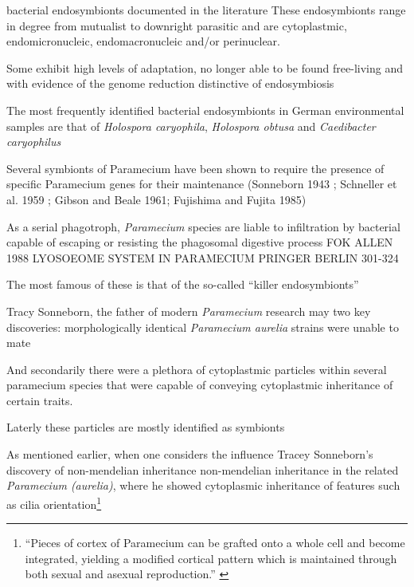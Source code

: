 bacterial endosymbionts documented in the literature \citep{Gortz2009}
These endosymbionts range in degree from mutualist to downright parasitic and are cytoplastmic, endomicronucleic,
endomacronucleic and/or perinuclear. 

Some exhibit high levels of adaptation, no longer able to be found free-living and with evidence of the genome reduction
distinctive of endosymbiosis \citep{Gortz2009} %

The most frequently identified bacterial endosymbionts in German environmental samples are that of \textit{Holospora  caryophila},
\textit{Holospora obtusa} and \textit{Caedibacter caryophilus}


Several symbionts of Paramecium have been shown to require the presence of specific Paramecium genes for their maintenance (Sonneborn 1943 ; Schneller et al. 1959 ; Gibson and Beale 1961; Fujishima and Fujita 1985)


As a serial phagotroph, \textit{Paramecium} species are liable to infiltration by bacterial capable of escaping or resisting
the phagosomal digestive process FOK ALLEN 1988 LYOSOEOME SYSTEM IN PARAMECIUM PRINGER BERLIN 301-324





The most famous of these is that of the so-called ``killer endosymbionts'' 


Tracy Sonneborn, the father of modern \textit{Paramecium} research may two key discoveries:
morphologically identical \textit{Paramecium aurelia} strains were unable to mate 

And secondarily there were a plethora of cytoplastmic particles within several paramecium species
that were capable of conveying cytoplastmic inheritance of certain traits.

Laterly these particles are mostly identified as symbionts 


\citep{Corliss1974} 





As mentioned earlier, when one considers the influence Tracey Sonneborn's discovery of non-mendelian
inheritance non-mendelian inheritance in the related \textit{Paramecium (aurelia)}, where he showed
cytoplasmic inheritance of features such as cilia orientation\footnote{``Pieces of cortex of Paramecium can be grafted onto a whole cell and
become integrated, yielding a modified cortical pattern which is maintained through both sexual and asexual reproduction.'' \citep{Beisson1965}}

